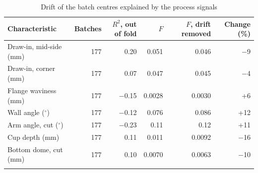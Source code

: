 \documentclass[pdflatex,sn-basic]{sn-jnl}
\newcommand{\tabsize}{\fontsize{8}{9.5}\selectfont}
\begin{document}
\begin{table}[tbp]
\tabsize
\setlength{\tabcolsep}{5pt}
\caption{Drift of the batch centres explained by the process signals}\label{tab:inline}
\begin{tabular}{@{}lrrrrr@{}}
\toprule
Characteristic & Batches & $R^2$, out of fold & $F$ & $F$, drift removed & Change (\%) \\
\midrule
Draw-in, mid-side (mm) & 177 & 0.20 & 0.051 & 0.046 & $-$9 \\
Draw-in, corner (mm) & 177 & 0.07 & 0.047 & 0.045 & $-$4 \\
Flange waviness (mm) & 177 & $-$0.15 & 0.0028 & 0.0030 & +6 \\
Wall angle ($^\circ$) & 177 & $-$0.12 & 0.076 & 0.086 & +12 \\
Arm angle, cut ($^\circ$) & 177 & $-$0.23 & 0.11 & 0.12 & +11 \\
Cup depth (mm) & 177 & 0.11 & 0.011 & 0.0092 & $-$16 \\
Bottom dome, cut (mm) & 177 & 0.10 & 0.0070 & 0.0063 & $-$10 \\
\botrule
\end{tabular}
\end{table}

{\small
}
\end{document}
